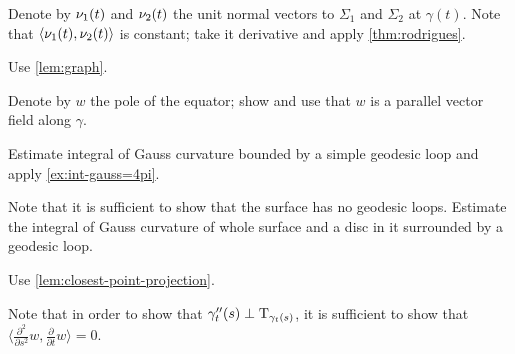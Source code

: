   Denote by $\nu_1(t)$ and $\nu_2(t)$ the unit normal vectors to $\Sigma_1$ and $\Sigma_2$ at $\gamma(t)$.
Note that $\langle \nu_1(t),\nu_2(t)\rangle$ is constant; take it derivative and apply \ref{thm:rodrigues}.

 Use \ref{lem:graph}.

 Denote by $w$ the pole of the equator; show and use that $w$ is a parallel vector field along $\gamma$.

 Estimate integral of Gauss curvature bounded by a simple geodesic loop and apply \ref{ex:int-gauss=4pi}.

 Note that it is sufficient to show that the surface has no geodesic loops.
Estimate the integral of Gauss curvature of whole surface and a disc in it surrounded by a geodesic loop.



 Use \ref{lem:closest-point-projection}.



 Note that in order to show that $\gamma''_t(s)\perp\mathrm{T}_{\gamma_t(s)}$, it is sufficient to show that $\langle\tfrac{\partial^2}{\partial s^2}w,\tfrac{\partial}{\partial t}w\rangle=0$.






